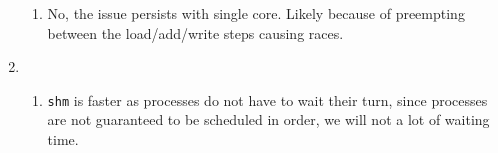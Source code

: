 \documentclass[12pt, a4paper]{article}
\begin{document}
\begin{enumerate}[Q\arabic*.]
\begin{enumerate}[(\alph*.)]
      \item No, the issue persists with single core. Likely because of preempting between the load/add/write steps causing races. 
    \end{enumerate}

  \item 
    \begin{enumerate}[(\alph*.)]
      \item \lstinline|shm| is faster as processes do not have to wait their turn, since processes are not guaranteed to be scheduled in order, we will not a lot of waiting time.
    \end{enumerate}
\end{enumerate}
\end{document}

